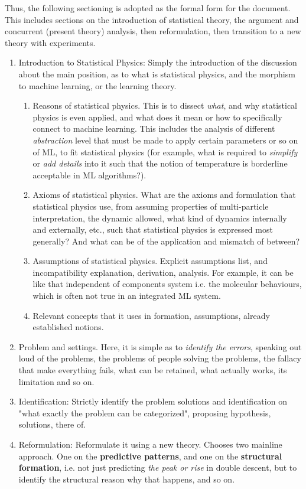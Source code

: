 Thus, the following sectioning is adopted as the formal form for the document. This includes sections on the introduction of statistical theory, the argument and concurrent (present theory) analysis, then reformulation, then transition to a new theory with experiments. 

\begin{enumerate}[topsep=1pt,itemsep=1pt]
    \item Introduction to Statistical Physics: Simply the introduction of the discussion about the main position, as to what is statistical physics, and the morphism to machine learning, or the learning theory. 
    \begin{enumerate}[topsep=1pt,itemsep=1pt]
        \item Reasons of statistical physics. This is to dissect \textit{what}, and why statistical physics is even applied, and what does it mean or how to specifically connect to machine learning. This includes the analysis of different \textit{abstraction} level that must be made to apply certain parameters or so on of ML, to fit statistical physics (for example, what is required to \textit{simplify} or \textit{add details} into it such that the notion of temperature is borderline acceptable in ML algorithms?).
        \item Axioms of statistical physics. What are the axioms and formulation that statistical physics use, from assuming properties of multi-particle interpretation, the dynamic allowed, what kind of dynamics internally and externally, etc., such that statistical physics is expressed most generally? And what can be of the application and mismatch of between? 
        \item Assumptions of statistical physics. Explicit assumptions list, and incompatibility explanation, derivation, analysis. For example, it can be like that independent of components system i.e. the molecular behaviours, which is often not true in an integrated ML system. 
        \item Relevant concepts that it uses in formation, assumptions, already established notions. 
    \end{enumerate}
    \item Problem and settings. Here, it is simple as to \textit{identify the errors}, speaking out loud of the problems, the problems of people solving the problems, the fallacy that make everything fails, what can be retained, what actually works, its limitation and so on. 
    \item Identification: Strictly identify the problem solutions and identification on "what exactly the problem can be categorized", proposing hypothesis, solutions, there of. 
    \item Reformulation: Reformulate it using a new theory. Chooses two mainline approach. One on the \textbf{predictive patterns}, and one on the \textbf{structural formation}, i.e. not just predicting \textit{the peak or rise} in double descent, but to identify the structural reason why that happens, and so on. 
\end{enumerate}

